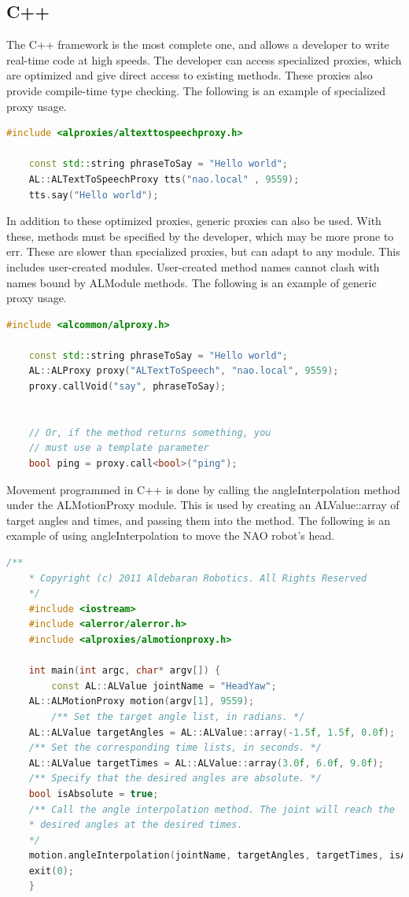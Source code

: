 \documentclass[onecolumn, draftclsnofoot,10pt, compsoc]{IEEEtran}
\begin{document}
\subsection{C++}
The C++ framework is the most complete one, and allows a developer to write real-time code at high speeds.
The developer can access specialized proxies, which are optimized and give direct access to existing methods.
These proxies also provide compile-time type checking.
The following is an example of specialized proxy usage.
\begin{lstlisting}[language=C++]
	#include <alproxies/altexttospeechproxy.h>

	const std::string phraseToSay = "Hello world";
	AL::ALTextToSpeechProxy tts("nao.local" , 9559);
	tts.say("Hello world");
\end{lstlisting}
In addition to these optimized proxies, generic proxies can also be used.
With these, methods must be specified by the developer, which may be more prone to err.
These are slower than specialized proxies, but can adapt to any module.
This includes user-created modules. User-created method names cannot clash with names bound by ALModule methods.
The following is an example of generic proxy usage. \cite{NAOSDK:C++}
\begin{lstlisting}[language=C++]
	#include <alcommon/alproxy.h>

	const std::string phraseToSay = "Hello world";
	AL::ALProxy proxy("ALTextToSpeech", "nao.local", 9559);
	proxy.callVoid("say", phraseToSay);


	// Or, if the method returns something, you
	// must use a template parameter
	bool ping = proxy.call<bool>("ping");
\end{lstlisting}

Movement programmed in C++ is done by calling the angleInterpolation method under the ALMotionProxy module.
This is used by creating an ALValue::array of target angles and times, and passing them into the method.
The following is an example of using angleInterpolation to move the NAO robot's head.
\begin{lstlisting}[language=C++]
	/**
	* Copyright (c) 2011 Aldebaran Robotics. All Rights Reserved
	*/
	#include <iostream>
	#include <alerror/alerror.h>
	#include <alproxies/almotionproxy.h>

	int main(int argc, char* argv[]) {
		const AL::ALValue jointName = "HeadYaw";
    AL::ALMotionProxy motion(argv[1], 9559);
	 	/** Set the target angle list, in radians. */
    AL::ALValue targetAngles = AL::ALValue::array(-1.5f, 1.5f, 0.0f);
    /** Set the corresponding time lists, in seconds. */
    AL::ALValue targetTimes = AL::ALValue::array(3.0f, 6.0f, 9.0f);
    /** Specify that the desired angles are absolute. */
    bool isAbsolute = true;
    /** Call the angle interpolation method. The joint will reach the
    * desired angles at the desired times.
    */
    motion.angleInterpolation(jointName, targetAngles, targetTimes, isAbsolute);
  	exit(0);
	}

\end{lstlisting}
\end{document}
